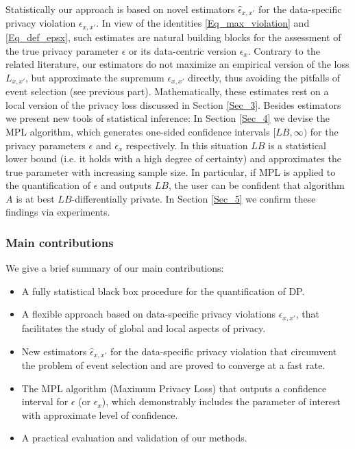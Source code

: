 \documentclass[conference]{IEEEtran}
\begin{document}
\begin{comment}
\begin{figure}
\centering
\texttt{[image: arrow\_3.png]}\\
\caption{Different privacy measures}
\end{figure}
\end{comment}

Statistically our approach is based on novel estimators $\hat \epsilon_{x,x'}$ for the data-specific privacy violation $\epsilon_{x,x'}$. In view of the identities \eqref{Eq_max_violation} and \eqref{Eq_def_epsx}, such estimates are natural building blocks for the assessment of the true privacy parameter $\epsilon$ or its data-centric version $\epsilon_x$. Contrary to the related literature, our estimators do not maximize an empirical version of the loss $L_{x,x'}$, but approximate the supremum $\epsilon_{x,x'}$ directly, thus avoiding the pitfalls of event selection (see previous part). Mathematically, these estimates rest on a local version of the privacy loss discussed in Section \ref{Sec_3}. Besides estimators we present new tools of statistical inference: In Section \ref{Sec_4} we devise the MPL algorithm, which generates one-sided confidence intervals $[LB, \infty)$ for the privacy parameters $\epsilon$ and $\epsilon_x$ respectively. In this situation $LB$ is a statistical lower bound (i.e. it holds with a high degree of certainty) and approximates the true parameter with increasing sample size. In particular, if MPL is applied to the quantification of $\epsilon$ and outputs $LB$, the user can be confident that algorithm $A$ is at best $LB$-differentially private. In Section \ref{Sec_5} we confirm these findings via experiments.



\subsubsection*{\textbf{Main contributions}}

We give a brief summary of our main contributions:


\begin{itemize}
    \item A fully statistical black box procedure for the quantification of DP.
    \item A flexible approach based on data-specific privacy violations $\epsilon_{x,x'}$, that facilitates the study of global and local aspects of privacy.
    \item New estimators $\hat \epsilon_{x,x'}$ for the data-specific privacy violation that circumvent the problem of event selection and are proved to converge at a fast rate. 
    \item The MPL algorithm (Maximum Privacy Loss) that outputs a confidence interval for $\epsilon$ (or $\epsilon_x$), which demonstrably includes the parameter of interest with approximate level of confidence.
    \item A practical evaluation and validation of our methods. 
\end{itemize}
\end{document}
